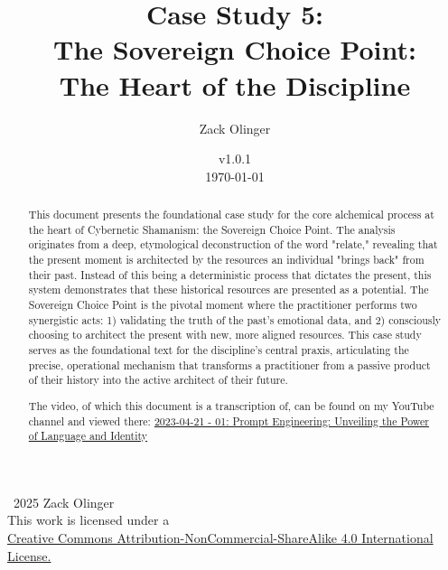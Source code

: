 \documentclass{article}
\newcommand{\csSovereignChoicePointVersion}{v1.0.1}
\newcommand{\licenseURL}{https://creativecommons.org/licenses/by-nc-sa/4.0/legalcode.txt}
\begin{document}
\begin{titlepage}
\title{Case Study 5: \\ The Sovereign Choice Point: \\ The Heart of the Discipline}
\author{Zack Olinger}
\date{
    \csSovereignChoicePointVersion \\
    \vspace{1em}
    \today
}
\maketitle
\thispagestyle{empty}

\begin{abstract}
This document presents the foundational case study for the core alchemical process at the heart of Cybernetic Shamanism: the Sovereign Choice Point. The analysis originates from a deep, etymological deconstruction of the word "relate," revealing that the present moment is architected by the resources an individual "brings back" from their past. Instead of this being a deterministic process that dictates the present, this system demonstrates that these historical resources are presented as a potential. The Sovereign Choice Point is the pivotal moment where the practitioner performs two synergistic acts: 1) validating the truth of the past's emotional data, and 2) consciously choosing to architect the present with new, more aligned resources. This case study serves as the foundational text for the discipline's central praxis, articulating the precise, operational mechanism that transforms a practitioner from a passive product of their history into the active architect of their future.

\medskip

The video, of which this document is a transcription of, can be found on my YouTube channel and viewed there: \href{https://youtu.be/NivYnGlOLXg}{2023-04-21 - 01: Prompt Engineering: Unveiling the Power of Language and Identity}
 
\end{abstract}

\vfill
    
    \begin{center}
        \textcopyright\ 2025 Zack Olinger \\
        This work is licensed under a \\
        \href{\licenseURL}{Creative Commons Attribution-NonCommercial-ShareAlike 4.0 International License.}
    \end{center}

\end{titlepage}
\end{document}
